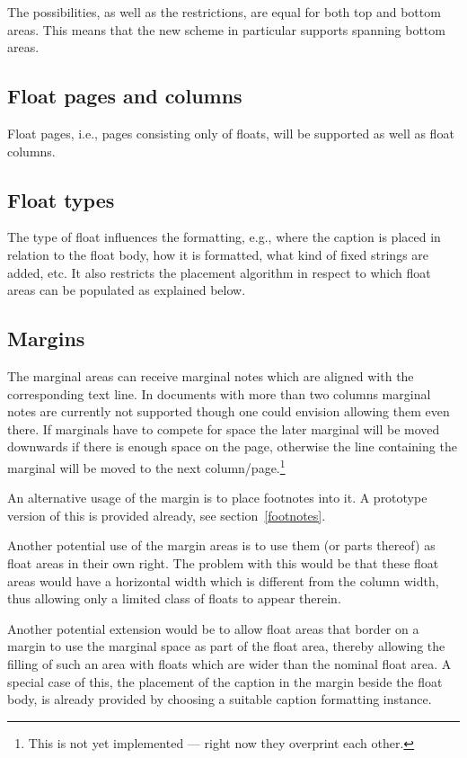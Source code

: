 \documentclass[twocolumn]{article}
\begin{document}

The possibilities, as well as the restrictions, are equal for both top
and bottom areas. This means that the new scheme in particular
supports spanning bottom areas.

\ORspecial\ShowGridfalse

\subsection{Float pages and columns}

Float pages, i.e., pages consisting only of floats, will be supported
as well as float columns.


\subsection{Float types}

The type of float influences the formatting, e.g., where the caption
is placed in relation to the float body, how it is formatted, what
kind of fixed strings are added, etc. It also restricts the placement
algorithm in respect to which float areas can be populated as
explained below.


\subsection{Margins}

The marginal areas can receive marginal notes which are aligned with
the corresponding text line. In documents with more than two columns
marginal notes are currently not supported though one could envision
allowing them even there. If marginals have to compete for space the
later marginal will be moved downwards if there is enough space on the
page, otherwise the line containing the marginal will be moved to the
next column/\allowbreak page.\footnote{This is not yet implemented ---
right now they overprint each other.}

An alternative usage of the margin is to place footnotes into it. A
prototype version of this is provided already, see
section~\vref{footnotes}.

Another potential use of the margin areas is to use them (or parts
thereof) as float areas in their own right. The problem with this
would be that these float areas would have a horizontal width which is
different from the column width, thus allowing only a limited class of
floats to appear therein.

Another potential extension would be to allow float areas that border
on a margin to use the marginal space as part of the float area,
thereby allowing the filling of such an area with floats which are
wider than the nominal float area. A special case of this, the
placement of the caption in the margin beside the float body, is
already provided by choosing a suitable caption formatting instance.
\end{document}
